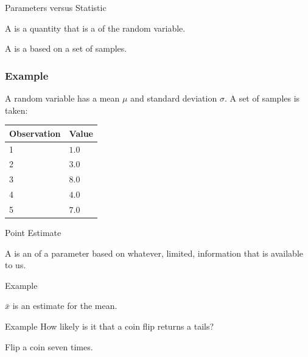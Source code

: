 \begin{frame}{Parameters versus Statistic}

  \begin{definition}[Parameter]
    A  is a quantity that is a 
    of the random variable.
  \end{definition}

  \begin{definition}[Statistic]
    A  is a  based on a set
    of samples.
  \end{definition}

\end{frame}




\begin{frame}
  \frametitle{Example}

  A random variable has a mean $\mu$ and standard deviation
  $\sigma$. A set of samples is taken: \\ [10pt]
  \begin{tabular}{l|l}
    Observation & Value \\ \hline
    1 & $1.0$ \\ 
    2 & $3.0$ \\
    3 & $8.0$ \\
    4 & $4.0$ \\
    5 & $7.0$
  \end{tabular}

\end{frame}


\begin{frame}{Point Estimate}

  \begin{definition}
    A  is an  of a
    parameter based on whatever, limited, information that is
    available to us.
  \end{definition}
\end{frame}


\begin{frame}{Example}

  $\bar{x}$ is an estimate for the mean.
  
\end{frame}

\begin{frame}{Example}
  How likely is it that a coin flip returns a tails?

  \vfill

  Flip a coin seven times.

  \vfill

\end{frame}


